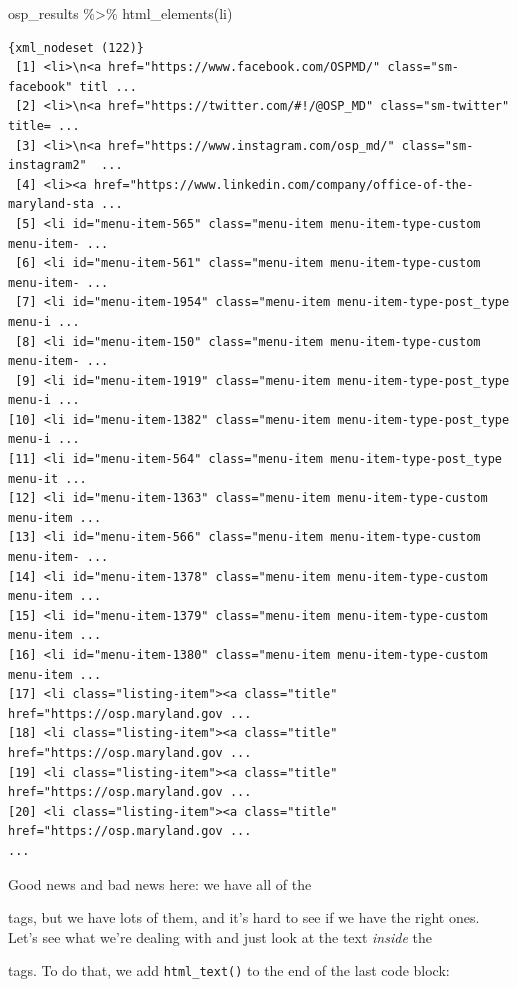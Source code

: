 \documentclass[
  letterpaper,
  DIV=11,
  numbers=noendperiod]{scrreprt}
\newenvironment{Shaded}{\begin{snugshade}}{\end{snugshade}}
\newcommand{\FunctionTok}[1]{\textcolor[rgb]{0.28,0.35,0.67}{#1}}
\newcommand{\NormalTok}[1]{\textcolor[rgb]{0.00,0.23,0.31}{#1}}
\newcommand{\SpecialCharTok}[1]{\textcolor[rgb]{0.37,0.37,0.37}{#1}}
\newcommand{\StringTok}[1]{\textcolor[rgb]{0.13,0.47,0.30}{#1}}
\begin{document}
\begin{Shaded}
\begin{Highlighting}[]
\NormalTok{osp\_results }\SpecialCharTok{\%\textgreater{}\%} \FunctionTok{html\_elements}\NormalTok{(}\StringTok{\textquotesingle{}li\textquotesingle{}}\NormalTok{)}
\end{Highlighting}
\end{Shaded}

\begin{verbatim}
{xml_nodeset (122)}
 [1] <li>\n<a href="https://www.facebook.com/OSPMD/" class="sm-facebook" titl ...
 [2] <li>\n<a href="https://twitter.com/#!/@OSP_MD" class="sm-twitter" title= ...
 [3] <li>\n<a href="https://www.instagram.com/osp_md/" class="sm-instagram2"  ...
 [4] <li><a href="https://www.linkedin.com/company/office-of-the-maryland-sta ...
 [5] <li id="menu-item-565" class="menu-item menu-item-type-custom menu-item- ...
 [6] <li id="menu-item-561" class="menu-item menu-item-type-custom menu-item- ...
 [7] <li id="menu-item-1954" class="menu-item menu-item-type-post_type menu-i ...
 [8] <li id="menu-item-150" class="menu-item menu-item-type-custom menu-item- ...
 [9] <li id="menu-item-1919" class="menu-item menu-item-type-post_type menu-i ...
[10] <li id="menu-item-1382" class="menu-item menu-item-type-post_type menu-i ...
[11] <li id="menu-item-564" class="menu-item menu-item-type-post_type menu-it ...
[12] <li id="menu-item-1363" class="menu-item menu-item-type-custom menu-item ...
[13] <li id="menu-item-566" class="menu-item menu-item-type-custom menu-item- ...
[14] <li id="menu-item-1378" class="menu-item menu-item-type-custom menu-item ...
[15] <li id="menu-item-1379" class="menu-item menu-item-type-custom menu-item ...
[16] <li id="menu-item-1380" class="menu-item menu-item-type-custom menu-item ...
[17] <li class="listing-item"><a class="title" href="https://osp.maryland.gov ...
[18] <li class="listing-item"><a class="title" href="https://osp.maryland.gov ...
[19] <li class="listing-item"><a class="title" href="https://osp.maryland.gov ...
[20] <li class="listing-item"><a class="title" href="https://osp.maryland.gov ...
...
\end{verbatim}

Good news and bad news here: we have all of the

tags, but we have lots of them, and it's hard to see if we have the
right ones. Let's see what we're dealing with and just look at the text
\emph{inside} the

tags. To do that, we add \texttt{html\_text()} to the end of the last
code block:
\end{document}
